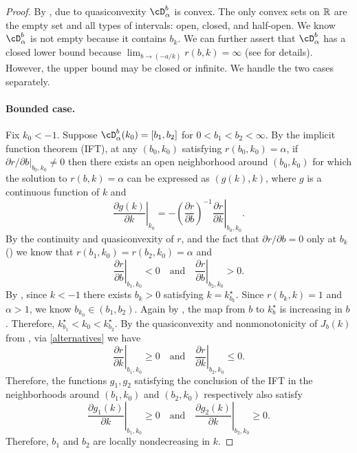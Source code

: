 \begin{proof}
	By , due to quasiconvexity $\bdomain_\alpha$ is convex.
	The only convex sets on $\mathbb{R}$ are the empty set and all types of intervals:
	open, closed, and half-open.
	We know $\bdomain_\alpha$ is not empty because it contains $b_k$.
	We can further assert that
	$\bdomain_\alpha$ has a closed lower bound
	because $\lim_{b \to (-a/k)} r(b, k) = \infty$
	(see \citet[\S A.3.3]{boyd-convex} for details).
	However, the upper bound may be closed or infinite.
	We handle the two cases separately.

	\paragraph{Bounded case.}
	Fix $k_0 < -1$.
	Suppose $\bdomain_\alpha(k_0) = [b_1, b_2]$ for $0 < b_1 < b_2 < \infty$.
	By the implicit function theorem (IFT), at any $(b_0, k_0)$ satisfying $r(b_0, k_0) = \alpha$,
	if $\partial r / \partial b|_{b_0, k_0} \neq 0$
	then there exists an open neighborhood around $(b_0, k_0)$
	for which the solution to $r(b, k) = \alpha$ can be expressed as
	$(g(k), k)$, where $g$ is a continuous function of $k$ and
	\[
		\left. \frac{\partial g(k)}{\partial k} \right|_{k_0} =
		\left. - \left( \frac{\partial r}{\partial b} \right)^{-1}
		\frac{\partial r}{\partial k} \right|_{b_0, k_0}.
	\]
	By the continuity and quasiconvexity of $r$,
	and the fact that $\partial r / \partial b = 0$ only at $b_k$
	()
	we know that $r(b_1, k_0) = r(b_2, k_0) = \alpha$
	and
	\[
		\left. \frac{\partial r}{\partial b} \right|_{b_1, k_0} < 0
		\quad \text{and} \quad
		\left. \frac{\partial r}{\partial b} \right|_{b_2, k_0} > 0.
	\]
	By ,
	since $k < -1$
	there exists $b_k > 0$ satisfying
	$k = k^\star_{b_k}$.
	Since $r(b_k, k) = 1$ and $\alpha > 1$, we know $b_{k_0} \in (b_1, b_2)$.
	Again by ,
	the map from $b$ to $k^\star_b$ is increasing in $b$.
	Therefore,
	\(
		{k^\star_{b_1} < k_0 < k^\star_{b_2}}.
	\)
	By the quasiconvexity and nonmonotonicity of $J_b(k)$ from ,
	via \ref{alternatives}
	we have
	\[
		\left. \frac{\partial r}{\partial k} \right|_{b_1, k_0} \geq 0
		\quad \text{and} \quad
		\left. \frac{\partial r}{\partial k} \right|_{b_2, k_0} \leq 0.
	\]
	Therefore, the functions $g_1, g_2$ satisfying the conclusion of the IFT
	in the neighborhoods around $(b_1, k_0)$ and $(b_2, k_0)$ respectively
	also satisfy
	\[
		\left. \frac{ \partial g_1(k)}{ \partial k } \right|_{b_1, k_0} \geq 0
		\quad \text{and} \quad
		\left. \frac{ \partial g_2(k)}{ \partial k } \right|_{b_2, k_0} \geq 0.
	\]
	Therefore, $b_1$ and $b_2$ are locally nondecreasing in $k$.
	


\end{proof}
